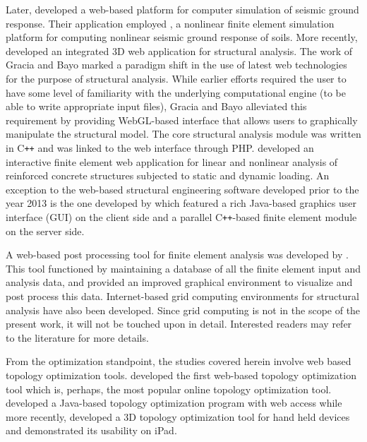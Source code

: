 \documentclass[preprint]{elsarticle}
\begin{document}
Later, \citet{Yang2004} developed a web-based platform for computer
simulation of seismic ground response. Their application employed \citet{cyclic1d}, a nonlinear finite element simulation platform for computing
nonlinear seismic ground response of soils. More recently,  \citet{gracia2013integrated} developed an integrated 3D web application for
structural analysis. The work of Gracia and Bayo marked a paradigm shift in the
use of latest web technologies for the purpose of structural analysis. While
earlier efforts required the user to have some level of familiarity with the
underlying computational engine (to be able to write appropriate input files),
Gracia and Bayo alleviated this requirement by providing WebGL-based
\cite{WebGL} interface that allows users to graphically manipulate the
structural model. The core structural analysis module was written in C{}\verb!++! and was
linked to the web interface through PHP. \citet{Hejazi2014}
developed an interactive finite element web application for linear and nonlinear
analysis of reinforced concrete structures subjected to static and dynamic
loading. An exception to the web-based
structural engineering software developed prior to the year 2013 is the one
developed by \citet{Chen2006} which featured a rich Java-based
graphics user interface (GUI) on the client side and a parallel C{}\verb!++!-based finite
element module on the server side.

A web-based post processing tool for finite element analysis was
developed by \citet{Weng2011}. This tool functioned by maintaining a
database of all the finite element input and analysis data, and provided an
improved graphical environment to visualize and post process this data.
Internet-based grid computing environments for structural analysis have also
been developed. Since grid computing is not in the scope of the present work, it will not be
touched upon in detail. Interested readers may refer to the literature
\cite{Alonso2007,Alonso2008,Chen2008,chen2011internet} for more details.

From the optimization standpoint, the studies covered herein involve web based
topology optimization tools. \citet{Tcherniak2001}
developed the first web-based topology optimization tool
\cite{TopOpt} which is, perhaps, the most popular online
topology optimization tool. \citet{Paulino2005} developed a
Java-based topology optimization program with web access while more recently,
\citet{Jorgensen2014} developed a 3D topology optimization
tool for hand held devices and demonstrated its usability on iPad.
\end{document}
